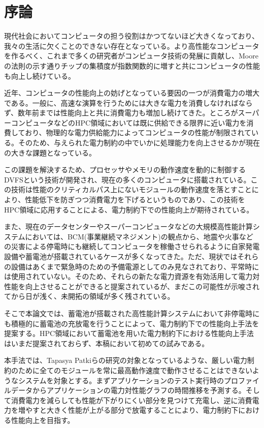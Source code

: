 \chapter{序論}

現代社会においてコンピュータの担う役割はかつてないほど大きくなっており、我々の生活に欠くことのできない存在となっている。より高性能なコンピュータを作るべく、これまで多くの研究者がコンピュータ技術の発展に貢献し、Mooreの法則\cite{mooreslaw}の示す通りチップの集積度が指数関数的に増すと共にコンピュータの性能も向上し続けている。

近年、コンピュータの性能向上の妨げとなっている要因の一つが消費電力の増大である。一般に、高速な演算を行うためには大きな電力を消費しなければならず、数年前までは性能向上と共に消費電力も増加し続けてきた。ところがスーパーコンピュータなどのHPC領域においては既に供給できる限界に近い電力を消費しており、物理的な電力供給能力によってコンピュータの性能が制限されている。そのため、与えられた電力制約の中でいかに処理能力を向上させるかが現在の大きな課題となっている。

この課題を解決するため、プロセッサやメモリの動作速度を動的に制御するDVFSという技術が開発され、現在の多くのコンピュータに搭載されている。この技術は性能のクリティカルパス上にないモジュールの動作速度を落とすことにより、性能低下を防ぎつつ消費電力を下げるというものであり、この技術をHPC領域に応用することによる、電力制約下での性能向上が期待されている。

また、現在のデータセンターやスーパーコンピュータなどの大規模高性能計算システムにおいては、BCM(事業継続マネジメント)の観点から、地震や火事などの災害による停電時にも継続してコンピュータを稼働させられるように自家発電設備や蓄電池が搭載されているケースが多くなってきた。ただ、現状ではそれらの設備はあくまで緊急時のための予備電源としてのみ見なされており、平常時には使用されていない。そのため、それらの新たな電力資源を有効活用して電力対性能を向上させることができると提案されている\cite{Govindan:2011:BLT:2024723.2000105}が、まだこの可能性が示唆されてから日が浅く、未開拓の領域が多く残されている。

そこで本論文では、蓄電池が搭載された高性能計算システムにおいて非停電時にも積極的に蓄電池の充放電を行うことによって、電力制約下での性能向上手法を提案する。HPC領域において蓄電池を用いた電力制約下における性能向上手法はいまだ提案されておらず、本稿において初めての試みである。

本手法では、Tapasya Patkiらの研究\cite{Patki:2013:EHO:2464996.2465009}の対象となっているような、厳しい電力制約のために全てのモジュールを常に最高動作速度で動作させることはできないようなシステムを対象とする。まずアプリケーションのテスト実行時のプロファイルデータからアプリケーションの電力対性能グラフの時間推移を予測する。そして消費電力を減らしても性能が下がりにくい部分を見つけて充電し、逆に消費電力を増やすと大きく性能が上がる部分で放電することにより、電力制約下における性能向上を目指す。

